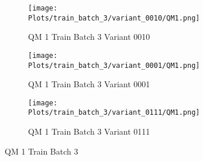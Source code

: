 \documentclass{DissertateFigs}
\begin{document}
\begin{figure}[t!]
\medskip

    \begin{subfigure}{0.47\textwidth}
    \texttt{[image: Plots/train\_batch\_3/variant\_0010/QM1.png]}
    \caption{QM 1 Train Batch 3 Variant 0010}
    \end{subfigure}
    \begin{subfigure}{0.47\textwidth}
    \texttt{[image: Plots/train\_batch\_3/variant\_0001/QM1.png]}
    \caption{QM 1 Train Batch 3 Variant 0001}
    \end{subfigure}

\medskip

    \begin{subfigure}{0.47\textwidth}
    \texttt{[image: Plots/train\_batch\_3/variant\_0111/QM1.png]}
    \caption{QM 1 Train Batch 3 Variant 0111}
    \end{subfigure}
\caption{QM 1 Train Batch 3}
    \end{figure}
\clearpage
\end{document}
